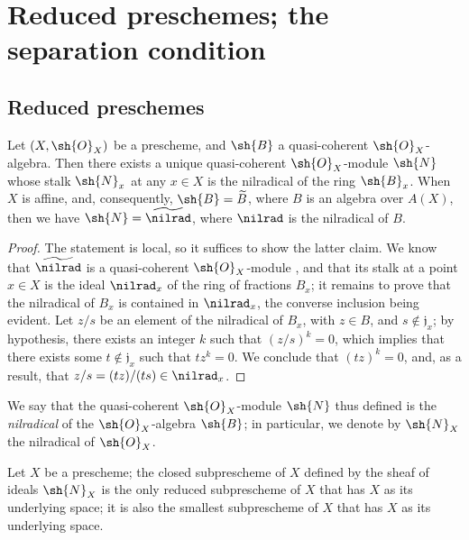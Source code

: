 \section{Reduced preschemes; the separation condition}
\label{section:I.5}

\subsection{Reduced preschemes}
\label{subsection:I.5.1}

\begin{proposition}[5.1.1]
\label{I.5.1.1}
Let $(X,\sh{O}_X)$ be a prescheme, and $\sh{B}$ a quasi-coherent $\sh{O}_X$-algebra.
Then there exists a unique quasi-coherent $\sh{O}_X$-module $\sh{N}$ whose stalk $\sh{N}_x$ at any $x\in X$ is the nilradical of the ring $\sh{B}_x$.
When $X$ is affine, and, consequently, $\sh{B}=\widetilde{B}$, where $B$ is an algebra over $A(X)$, then we have $\sh{N}=\widetilde{\nilrad}$, where $\nilrad$ is the nilradical of $B$.
\end{proposition}

\begin{proof}
The statement is local, so it suffices to show the latter claim.
We know that $\widetilde{\nilrad}$ is a quasi-coherent $\sh{O}_X$-module , and that its stalk at a point $x\in X$ is the ideal $\nilrad_x$ of the ring of fractions $B_x$;
it remains to prove that the nilradical of $B_x$ is contained in $\nilrad_x$, the converse inclusion being evident.
Let $z/s$ be an element of the nilradical of $B_x$, with $z\in B$, and $s\not\in\mathfrak{j}_x$;
by hypothesis, there exists an integer $k$ such that $(z/s)^k=0$, which implies that there exists some $t\not\in\mathfrak{j}_x$ such that $tz^k=0$.
We conclude that $(tz)^k=0$, and, as a result, that $z/s=(tz)/(ts)\in\nilrad_x$.
\end{proof}

We say that the quasi-coherent $\sh{O}_X$-module $\sh{N}$ thus defined is the \emph{nilradical} of the $\sh{O}_X$-algebra $\sh{B}$; in particular, we denote by $\sh{N}_X$ the nilradical of $\sh{O}_X$.

\begin{corollary}[5.1.2]
\label{I.5.1.2}
Let $X$ be a prescheme;
the closed subprescheme of $X$ defined by the sheaf of ideals $\sh{N}_X$ is the only reduced subprescheme  of $X$ that has $X$ as its underlying space;
it is also the smallest subprescheme of $X$ that has $X$ as its underlying space.
\end{corollary}

